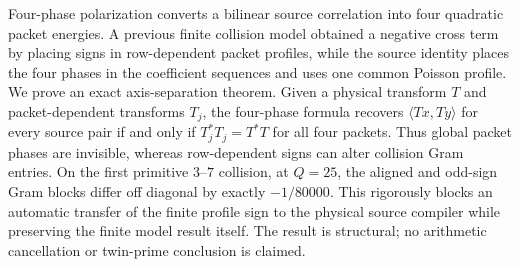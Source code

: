 Four-phase polarization converts a bilinear source correlation into four quadratic
packet energies.  A previous finite collision model obtained a negative cross term by
placing signs in row-dependent packet profiles, while the source identity places the
four phases in the coefficient sequences and uses one common Poisson profile.  We prove
an exact axis-separation theorem.  Given a physical transform $T$ and packet-dependent
transforms $T_j$, the four-phase formula recovers $\langle Tx,Ty\rangle$ for every
source pair if and only if $T_j^*T_j=T^*T$ for all four packets.  Thus global packet
phases are invisible, whereas row-dependent signs can alter collision Gram entries.
On the first primitive $3$--$7$ collision, at $Q=25$, the aligned and odd-sign Gram
blocks differ off diagonal by exactly $-1/80000$.  This rigorously blocks an automatic
transfer of the finite profile sign to the physical source compiler while preserving the
finite model result itself.  The result is structural; no arithmetic cancellation or
twin-prime conclusion is claimed.
